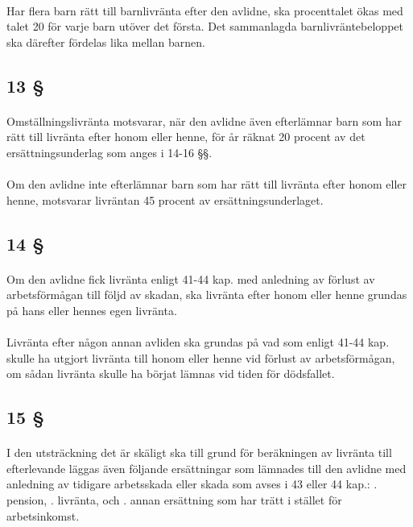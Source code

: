 \documentclass[a4paper,notitlepage,openany,10pt]{book}
\begin{document}
\paragraph*{}
Har flera barn rätt till barnlivränta efter den avlidne, ska procenttalet ökas med talet 20 för varje barn utöver det första. Det sammanlagda barnlivräntebeloppet ska därefter fördelas lika mellan barnen.
\subsection*{13 §}
\paragraph*{}
Omställningslivränta motsvarar, när den avlidne även efterlämnar barn som har rätt till livränta efter honom eller henne, för år räknat 20 procent av det ersättningsunderlag som anges i 14-16 §§.
\paragraph*{}
Om den avlidne inte efterlämnar barn som har rätt till livränta efter honom eller henne, motsvarar livräntan 45 procent av ersättningsunderlaget.
\subsection*{14 §}
\paragraph*{}
Om den avlidne fick livränta enligt 41-44 kap. med anledning av förlust av arbetsförmågan till följd av skadan, ska livränta efter honom eller henne grundas på hans eller hennes egen livränta.
\paragraph*{}
Livränta efter någon annan avliden ska grundas på vad som enligt 41-44 kap. skulle ha utgjort livränta till honom eller henne vid förlust av arbetsförmågan, om sådan livränta skulle ha börjat lämnas vid tiden för dödsfallet.
\subsection*{15 §}
\paragraph*{}
I den utsträckning det är skäligt ska till grund för beräkningen av livränta till efterlevande läggas även följande ersättningar som lämnades till den avlidne med anledning av tidigare arbetsskada eller skada som avses i 43 eller 44 kap.:
. pension,
. livränta, och
. annan ersättning som har trätt i stället för arbetsinkomst.
\end{document}
